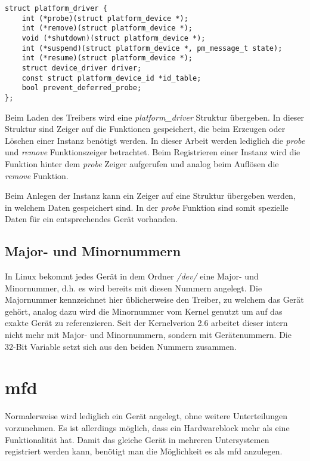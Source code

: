 \begin{lstfloat}
\begin{lstlisting}
struct platform_driver {
	int (*probe)(struct platform_device *);
	int (*remove)(struct platform_device *);
	void (*shutdown)(struct platform_device *);
	int (*suspend)(struct platform_device *, pm_message_t state);
	int (*resume)(struct platform_device *);
	struct device_driver driver;
	const struct platform_device_id *id_table;
	bool prevent_deferred_probe;
};
\end{lstlisting}
\end{lstfloat}

Beim Laden des Treibers wird eine \textit{platform\_driver} Struktur übergeben. In dieser Struktur sind Zeiger auf die Funktionen gespeichert, die beim Erzeugen oder Löschen einer Instanz benötigt werden.  
In dieser Arbeit werden lediglich die \textit{probe} und \textit{remove} Funktionszeiger betrachtet. Beim Registrieren einer Instanz wird die Funktion hinter dem \textit{probe} Zeiger aufgerufen und analog beim Auflösen die \textit{remove} Funktion.\cite{corbetplatform}  %

Beim Anlegen der Instanz kann ein Zeiger auf eine Struktur übergeben werden, in welchem Daten gespeichert sind. In der \textit{probe} Funktion sind somit spezielle Daten für ein entsprechendes Gerät vorhanden. \cite{corbetplatform} %


\subsection{Major- und Minornummern}\label{sec:mmnum_t}
In Linux bekommt jedes Gerät in dem Ordner \textit{/dev/} eine Major- und Minornummer, d.h. es wird bereits mit diesen Nummern angelegt.
Die Majornummer kennzeichnet hier üblicherweise den Treiber, zu welchem das Gerät gehört, analog dazu wird die Minornummer vom Kernel genutzt um auf das exakte Gerät zu referenzieren. \citep[S. 43f.]{corbet2005linux} %
Seit der Kernelverion 2.6 arbeitet dieser intern nicht mehr mit Major- und Minornummern, sondern mit Gerätenummern. Die 32-Bit Variable setzt sich aus den beiden Nummern zusammen. \citep[Seite 244]{schroder2009embedded}%

\section{\acl{mfd}}\label{sec:mfd_t}
Normalerweise wird lediglich ein Gerät angelegt, ohne weitere Unterteilungen vorzunehmen. Es ist allerdings möglich, dass ein Hardwareblock mehr als eine Funktionalität hat. Damit das gleiche Gerät in mehreren Untersystemen registriert werden kann, benötigt man die Möglichkeit es als \ac{mfd} anzulegen. \cite{bellonimfd} %

